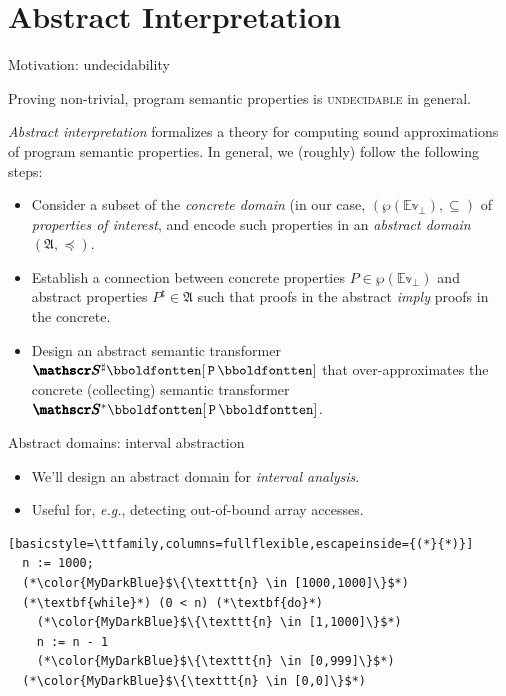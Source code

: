 \documentclass[aspectratio=169]{beamer}
\begin{document}
\section{Abstract Interpretation}
\begin{frame}{Motivation: undecidability}
  \begin{center}
    Proving non-trivial, program semantic properties is
    \textsc{undecidable} in general.
  \end{center}
  \pause\bigskip
  \emph{Abstract interpretation} formalizes a theory for computing
  sound approximations of program semantic properties.
  In general, we (roughly) follow the following steps:

  \bigskip
  \begin{itemize}
  \item Consider a subset of the \emph{concrete domain} (in our case,
    $(\wp(\mathbb{Ev}_\bot),\subseteq)$ of \emph{properties of
      interest}, and encode such properties in an \emph{abstract
      domain}
    $(\pmb{\mathfrak{A}},\preccurlyeq)$.
  \end{itemize}
  \begin{itemize}
  \item Establish a connection between concrete properties
    $P \in \wp(\mathbb{Ev}_\bot)$ and abstract properties
    $P^\sharp \in \mathfrak{A}$ such that proofs in the abstract
    \emph{imply} proofs in the concrete.
  \end{itemize}
  \begin{itemize}
  \item Design an abstract semantic transformer $\asem{\texttt{P}}$
    that over-approximates the concrete (collecting) semantic
    transformer $\csem{\texttt{P}}$.
  \end{itemize}
\end{frame}
%
\begin{frame}[fragile]{Abstract domains: interval abstraction}
  \begin{itemize}
  \item We'll design an abstract domain for \emph{interval analysis}.
  \item Useful for, \emph{e.g.}, detecting out-of-bound array
    accesses.
  \end{itemize}
\begin{lstlisting}[basicstyle=\ttfamily,columns=fullflexible,escapeinside={(*}{*)}]
  n := 1000;
  (*\color{MyDarkBlue}$\{\texttt{n} \in [1000,1000]\}$*)
  (*\textbf{while}*) (0 < n) (*\textbf{do}*)
    (*\color{MyDarkBlue}$\{\texttt{n} \in [1,1000]\}$*)
    n := n - 1
    (*\color{MyDarkBlue}$\{\texttt{n} \in [0,999]\}$*)
  (*\color{MyDarkBlue}$\{\texttt{n} \in [0,0]\}$*)
\end{lstlisting}
\end{frame}
\end{document}
